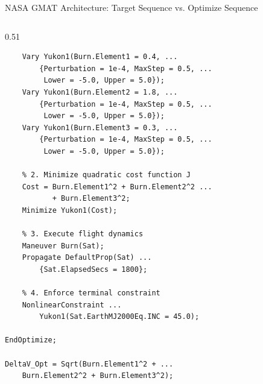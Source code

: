 \documentclass[aspectratio=169, 10pt]{beamer}
\begin{document}
\begin{frame}[fragile]{NASA GMAT Architecture: Target Sequence vs. Optimize Sequence}
\begin{columns}[t]
\begin{column}{0.51\textwidth}
\begin{lstlisting}[style=gmatcompact]
    % 1. Vary controls with box bounds
    Vary Yukon1(Burn.Element1 = 0.4, ...
        {Perturbation = 1e-4, MaxStep = 0.5, ...
         Lower = -5.0, Upper = 5.0});
    Vary Yukon1(Burn.Element2 = 1.8, ...
        {Perturbation = 1e-4, MaxStep = 0.5, ...
         Lower = -5.0, Upper = 5.0});
    Vary Yukon1(Burn.Element3 = 0.3, ...
        {Perturbation = 1e-4, MaxStep = 0.5, ...
         Lower = -5.0, Upper = 5.0});

    % 2. Minimize quadratic cost function J
    Cost = Burn.Element1^2 + Burn.Element2^2 ...
           + Burn.Element3^2;
    Minimize Yukon1(Cost);

    % 3. Execute flight dynamics
    Maneuver Burn(Sat);
    Propagate DefaultProp(Sat) ...
        {Sat.ElapsedSecs = 1800};

    % 4. Enforce terminal constraint
    NonlinearConstraint ...
        Yukon1(Sat.EarthMJ2000Eq.INC = 45.0);

EndOptimize;

DeltaV_Opt = Sqrt(Burn.Element1^2 + ...
    Burn.Element2^2 + Burn.Element3^2);
\end{lstlisting}
        \end{column}
    \end{columns}
\end{frame}
\end{document}
